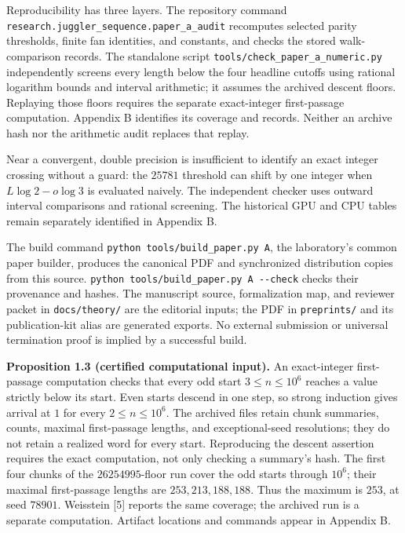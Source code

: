 \documentclass[12pt]{article}
\begin{document}
Reproducibility has three layers. The repository command
\texttt{\nolinkurl{research.juggler_sequence.paper_a_audit}} recomputes
selected parity thresholds, finite fan identities, and constants, and
checks the stored walk-comparison records. The standalone script
\texttt{\nolinkurl{tools/check_paper_a_numeric.py}} independently
screens every length below the four headline cutoffs using rational
logarithm bounds and interval arithmetic; it assumes the archived
descent floors. Replaying those floors requires the separate
exact-integer first-passage computation. Appendix B identifies its
coverage and records. Neither an archive hash nor the arithmetic audit
replaces that replay.

Near a convergent, double precision is insufficient to identify an exact
integer crossing without a guard: the \(25781\) threshold can shift by
one integer when \(L\log2-o\log3\) is evaluated naively. The independent
checker uses outward interval comparisons and rational screening. The
historical GPU and CPU tables remain separately identified in Appendix
B.

The build command \texttt{python\ tools/build\_paper.py\ A}, the
laboratory's common paper builder, produces the canonical PDF and
synchronized distribution copies from this source.
\texttt{python\ tools/build\_paper.py\ A\ -\/-check} checks their
provenance and hashes. The manuscript source, formalization map, and
reviewer packet in \texttt{\nolinkurl{docs/theory/}} are the editorial
inputs; the PDF in \texttt{\nolinkurl{preprints/}} and its
publication-kit alias are generated exports. No external submission or
universal termination proof is implied by a successful build.

\textbf{Proposition 1.3 (certified computational input).} An
exact-integer first-passage computation checks that every odd start
\(3\le n\le10^6\) reaches a value strictly below its start. Even starts
descend in one step, so strong induction gives arrival at \(1\) for
every \(2\le n\le10^6\). The archived files retain chunk summaries,
counts, maximal first-passage lengths, and exceptional-seed resolutions;
they do not retain a realized word for every start. Reproducing the
descent assertion requires the exact computation, not only checking a
summary's hash. The first four chunks of the \(26254995\)-floor run
cover the odd starts through \(10^6\); their maximal first-passage
lengths are \(253,213,188,188\). Thus the maximum is \(253\), at seed
\(78901\). Weisstein {[}5{]} reports the same coverage; the archived run
is a separate computation. Artifact locations and commands appear in
Appendix B.
\end{document}
